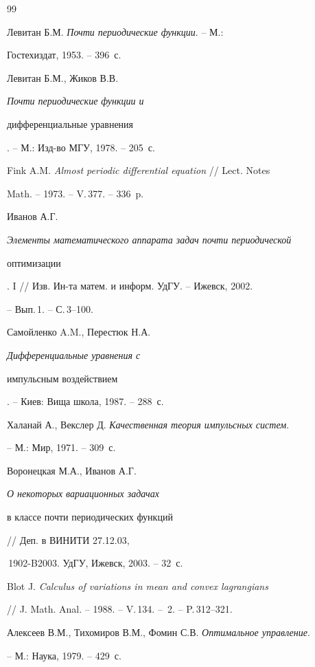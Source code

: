 \begin{thebibliography}{99}




Левитан Б.М. {\em Почти периодические функции}. -- М.: 

Гостехиздат, 1953. -- 396~с.


Левитан Б.М., Жиков В.В. {\em Почти периодические функции и 

дифференциальные уравнения}. -- М.: Изд-во МГУ, 1978. -- 205~с.


Fink A.M. {\em Almost periodic differential equation} // Lect. Notes 

Math. -- 1973. -- V.\,377. -- 336~p.


Иванов А.Г. {\em Элементы математического аппарата задач почти периодической 

оптимизации}. I // Изв. Ин-та матем. и информ. УдГУ. -- Ижевск, 2002.

-- Вып.\,1. -- С.\,3--100.


Самойленко A.M., Перестюк Н.А. {\em Дифференциальные уравнения с 

импульсным воздействием}. -- Киев: Вища школа, 1987. -- 288~с.


Халанай А., Векслер Д. {\em Качественная теория импульсных систем}. 

-- М.: Мир, 1971. -- 309~с.


Воронецкая М.А., Иванов А.Г. {\em О некоторых вариационных задачах 

в классе почти периодических функций} // Деп. в ВИНИТИ 27.12.03,

\No\,1902-B2003. УдГУ, Ижевск, 2003. -- 32~с.


Blot J. {\em Calculus of variations in mean and convex lagrangians}

// J. Math. Anal. -- 1988. -- V.\,134. -- \No\,2. -- P.\,312--321.


Алексеев В.М., Тихомиров В.М., Фомин С.В. {\em Оптимальное управление}.

-- М.: Наука, 1979. -- 429~с.


\end{thebibliography}
